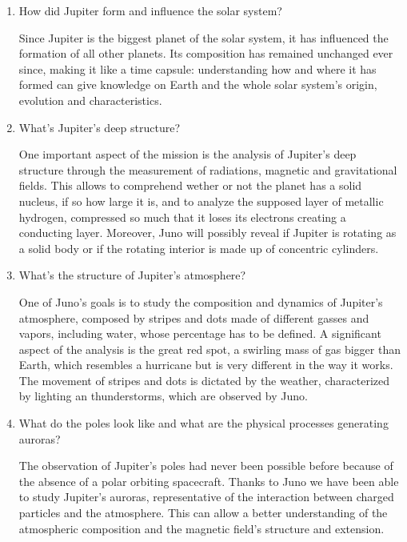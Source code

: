\begin{enumerate}
    \item How did Jupiter form and influence the solar system?

    Since Jupiter is the biggest planet of the solar system, it has influenced the formation of all other planets. Its composition has remained unchanged ever since, making it like a time capsule: understanding how and where it has formed can give knowledge on Earth and the whole solar system’s origin, evolution and characteristics.

 
    \item What's Jupiter's deep structure?
    
    One important aspect of the mission is the analysis of Jupiter's deep structure through the measurement of radiations, magnetic and gravitational fields. This allows to comprehend wether or not the planet has a solid nucleus, if so how large it is, and to analyze the supposed layer of metallic hydrogen, compressed so much that it loses its electrons creating a conducting layer.  Moreover, Juno will possibly reveal if Jupiter is rotating as a solid body or if the rotating interior is made up of concentric cylinders.

    \item What's the structure of Jupiter's atmosphere?
    
    One of Juno's goals is to study the composition and dynamics of Jupiter's atmosphere, composed by stripes and dots made of different gasses and vapors, including water, whose percentage has to be defined. A significant aspect of the analysis is the great red spot, a swirling mass of gas bigger than Earth, which resembles a hurricane but is very different in the way it works. The movement of stripes and dots is dictated by the weather, characterized by lighting an thunderstorms, which are observed by Juno.

    \item What do the poles look like and what are the physical processes generating auroras?
    
    The observation of Jupiter's poles had never been possible before because of the absence of a polar orbiting spacecraft. Thanks to Juno we have been able to study Jupiter's auroras, representative of the interaction between charged particles and the atmosphere. This can allow a better understanding of the atmospheric composition and the magnetic field's structure and extension.

\end{enumerate}

